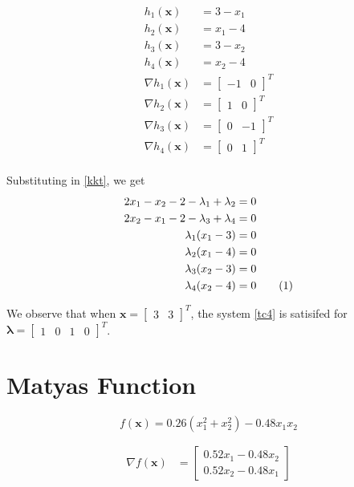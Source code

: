 \documentclass[a4paper]{article}
\newcommand{\numberthis}{\addtocounter{equation}{1}\tag{\theequation}}
\newcommand{\labeleqn}[1]{\numberthis \label{#1}}
\begin{document}
\begin{align*}
h_1(\textbf{x}) &= 3 - x_1 \\
h_2(\textbf{x}) &= x_1 - 4 \\
h_3(\textbf{x}) &= 3 - x_2 \\
h_4(\textbf{x}) &= x_2 - 4 \\
\nabla h_1(\textbf{x}) &= \begin{bmatrix} -1 & 0 \end{bmatrix} ^T \\
\nabla h_2(\textbf{x}) &= \begin{bmatrix} 1 & 0 \end{bmatrix} ^T \\
\nabla h_3(\textbf{x}) &= \begin{bmatrix} 0 & -1 \end{bmatrix} ^T \\
\nabla h_4(\textbf{x}) &= \begin{bmatrix} 0 & 1 \end{bmatrix} ^T \\
\end{align*}

Substituting in \eqref{kkt}, we get
\begin{align*}
2 x_1 - x_2 - 2 - \lambda_1 + \lambda_2 &= 0 \\
2 x_2 - x_1 - 2 - \lambda_3 + \lambda_4 &= 0 \\
\lambda_1 (x_1 - 3) &= 0 \\
\lambda_2 (x_1 - 4) &= 0 \\
\lambda_3 (x_2 - 3) &= 0 \\
\lambda_4 (x_2 - 4) &= 0 \labeleqn{tc4}
\end{align*}

We observe that when $\textbf{x} = \begin{bmatrix} 3 & 3 \end{bmatrix} ^T$, the system \eqref{tc4} is satisifed for $\boldsymbol{\lambda} = \begin{bmatrix} 1 & 0 & 1 & 0 \end{bmatrix} ^T$.

\section{Matyas Function}

$$f(\textbf{x}) = 0.26(x_1^2 + x_2^2) - 0.48 x_1 x_2$$

\begin{align*}
\nabla f(\textbf{x}) &=
    \begin{bmatrix}
        0.52 x_1 - 0.48 x_2 \\
        0.52 x_2 - 0.48 x_1
    \end{bmatrix}
\end{align*}
\end{document}
